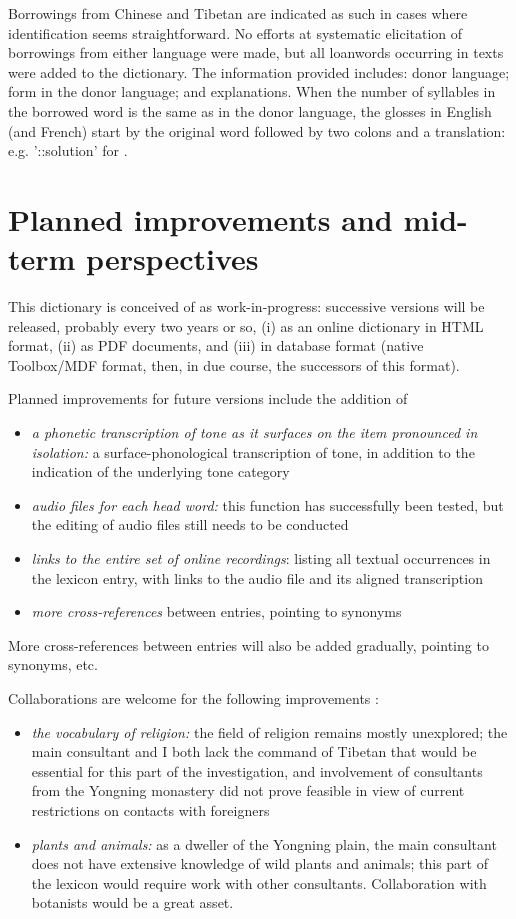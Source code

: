 Borrowings from Chinese and Tibetan are indicated as such in cases where identification seems straightforward. No efforts at systematic elicitation of borrowings from either language were made, but all loanwords occurring in texts were added to the dictionary. The information provided includes: donor language; form in the donor language; and explanations. When the number of syllables in the borrowed word is the same as in the donor language, the glosses in English (and French) start by the original word followed by two colons and a translation: e.g. '::solution' for . 

	\section{Planned improvements and mid-term perspectives} \label{sec:improv}
	
This dictionary is conceived of as work-in-progress: successive versions will be released, probably every two years or so, (i) as an online dictionary in HTML format, (ii) as PDF documents, and (iii) in database format (native Toolbox/MDF format, then, in due course, the successors of this format). 

Planned improvements for future versions include the addition of
\begin{itemize}
	\item \textit{a phonetic transcription of tone as it surfaces on the item pronounced in isolation:} a surface-phonological transcription of tone, in addition to the indication of the underlying tone category
	\item \textit{audio files for each head word:} this function has successfully been tested, but the editing of audio files still needs to be conducted
	\item \textit{links to the entire set of online recordings}: listing all textual occurrences in the lexicon entry, with links to the audio file and its aligned transcription
	\item \textit{more cross-references} between entries, pointing to synonyms
\end{itemize}

More cross-references between entries will also be added gradually, pointing to synonyms, etc.

Collaborations are welcome for the following improvements :
\begin{itemize}
	\item \textit{the vocabulary of religion:} the field of religion remains mostly unexplored; the main consultant and I both lack the command of Tibetan that would be essential for this part of the investigation, and involvement of consultants from the Yongning monastery did not prove feasible in view of current restrictions on contacts with foreigners
	\item \textit{plants and animals:} as a dweller of the Yongning plain, the main consultant does not have extensive knowledge of wild plants and animals; this part of the lexicon would require work with other consultants. Collaboration with botanists would be a great asset.
\end{itemize}

